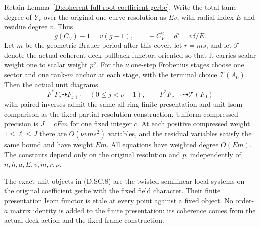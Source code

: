 \begin{lemma}
\label{D:compressed-skew-Frobenius-unit-jets}
Retain Lemma~\ref{D:coherent-full-root-coefficient-gerbe}.
Write the total tame degree of $Y_V$ over the original
one-curve resolution as $Ev$, with radial index $E$
and residue degree $v$. Thus
\[
 g(C_V)-1=v(g-1),\qquad -C_V^2=d'=v\delta/E.
                                                        \tag{D.SC.7}
\]
Let $m$ be the geometric Brauer period after this cover,
let $r=ms$, and let $\mathscr T$ denote the actual
coherent deck pullback functor, oriented so that it
carries scalar weight one to scalar weight $p^\nu$.
For the $\nu$ one-step Frobenius stages choose one
sector and one rank-$m$ anchor at each stage, with
the terminal choice $\mathscr T(A_0)$. Then the actual
unit diagrams
\[
 F^*F_j\dashrightarrow F_{j+1}\quad(0\leq j<\nu-1),
 \qquad F^*F_{\nu-1}\dashrightarrow\mathscr T(F_0)
                                                        \tag{D.SC.8}
\]
with paired inverses admit the same all-ring finite
presentation and unit-Isom comparison as the fixed
partial-resolution construction. Uniform compressed
precision is $J=cEm$ for one fixed integer $c$.
At each positive compressed weight $1\leq\ell\leq J$
there are $O(\nu v m s^2)$ variables, and the residual
variables satisfy the same bound and have weight $Em$.
All equations have weighted degree $O(Em)$.
The constants depend only on the original resolution
and $p$, independently of $n,h,a,E,v,m,r,\nu$.

The exact unit objects in (D.SC.8) are the twisted
semilinear local systems on the original coefficient
gerbe with the fixed field character. Their finite
presentation Isom functor is etale at every point
against a fixed object. No order-$a$ matrix identity
is added to the finite presentation: its coherence
comes from the actual deck action and the fixed-frame
construction.
\end{lemma}

